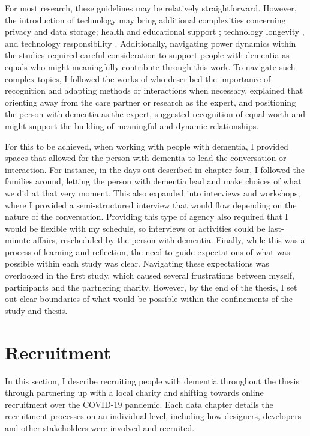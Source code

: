 For most research, these guidelines may be relatively straightforward. However, the introduction of technology may bring additional complexities concerning privacy and data storage; health and educational support \citep{gray2016inscribing}; technology longevity \citep{foley_printer_2019}, and technology responsibility \citep{ferrario_software_2014}. Additionally, navigating power dynamics within the studies required careful consideration to support people with dementia as equals who might meaningfully contribute through this work. To navigate such complex topics, I followed the works of \cite{nolan_beyond_2004,bartlett_personhood_2007,keady_involving_2007} who described the importance of recognition and adapting methods or interactions when necessary. \cite{nolan2002towards} explained that orienting away from the care partner or research as the expert, and positioning the person with dementia as the expert, suggested recognition of equal worth and might support the building of meaningful and dynamic relationships. 

For this to be achieved, when working with people with dementia, I provided spaces that allowed for the person with dementia to lead the conversation or interaction. For instance, in the days out described in chapter four, I followed the families around, letting the person with dementia lead and make choices of what we did at that very moment. This also expanded into interviews and workshops, where I provided a semi-structured interview that would flow depending on the nature of the conversation. Providing this type of agency also required that I would be flexible with my schedule, so interviews or activities could be last-minute affairs, rescheduled by the person with dementia. Finally, while this was a process of learning and reflection, the need to guide expectations of what was possible within each study was clear. Navigating these expectations was overlooked in the first study, which caused several frustrations between myself, participants and the partnering charity. However, by the end of the thesis, I set out clear boundaries of what would be possible within the confinements of the study and thesis.

\section{Recruitment}
\label{Method:Recruitment}
In this section, I describe recruiting people with dementia throughout the thesis through partnering up with a local charity and shifting towards online recruitment over the COVID-19 pandemic. Each data chapter details the recruitment processes on an individual level, including how designers, developers and other stakeholders were involved and recruited.

